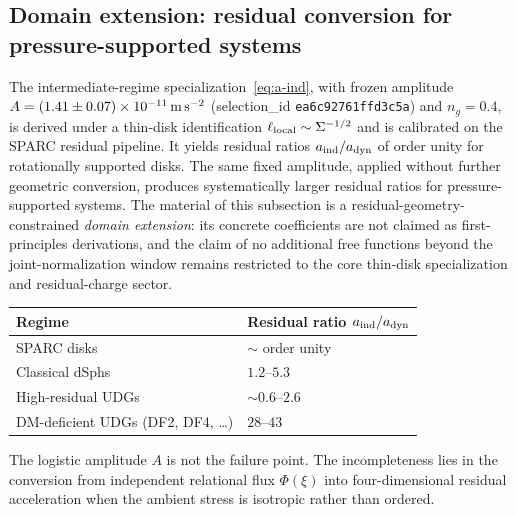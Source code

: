 \documentclass[11pt,a4paper]{article}
\begin{document}
\subsection{Domain extension: residual conversion for pressure-supported systems}
\label{sec:udg-domain}

The intermediate-regime specialization~\eqref{eq:a-ind}, with frozen amplitude \(A=(1.41\pm0.07)\times10^{-11}\,{\rm m\,s^{-2}}\) (selection\_id \texttt{ea6c92761ffd3c5a}) and \(n_g=0.4\), is derived under a thin-disk identification \(\ell_{\rm local}\sim\Sigma^{-1/2}\) and is calibrated on the SPARC residual pipeline. It yields residual ratios \(a_{\rm ind}/a_{\rm dyn}\) of order unity for rotationally supported disks. The same fixed amplitude, applied without further geometric conversion, produces systematically larger residual ratios for pressure-supported systems. The material of this subsection is a residual-geometry-constrained \emph{domain extension}: its concrete coefficients are not claimed as first-principles derivations, and the claim of no additional free functions beyond the joint-normalization window remains restricted to the core thin-disk specialization and residual-charge sector.

\begin{center}
\begin{tabular}{@{}ll@{}}
\toprule
Regime & Residual ratio \(a_{\rm ind}/a_{\rm dyn}\) \\
\midrule
SPARC disks & \(\sim\) order unity \\
Classical dSphs & \(1.2\)--\(5.3\) \\
High-residual UDGs & \(\sim0.6\)--\(2.6\) \\
DM-deficient UDGs (DF2, DF4, \ldots) & \(28\)--\(43\) \\
\bottomrule
\end{tabular}
\end{center}

The logistic amplitude \(A\) is not the failure point. The incompleteness lies in the conversion from independent relational flux \(\Phi(\xi)\) into four-dimensional residual acceleration when the ambient stress is isotropic rather than ordered.
\end{document}
